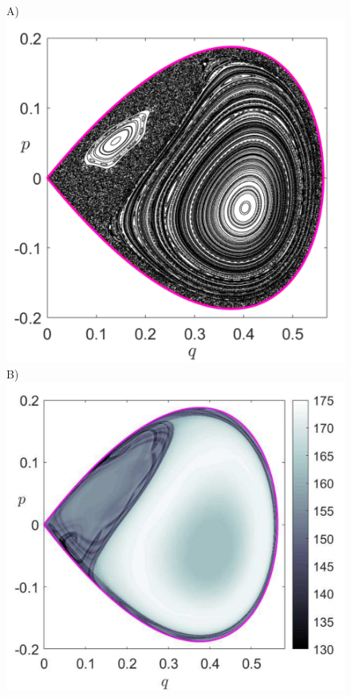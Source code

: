\documentclass{ws-ijbc}
\begin{document}
\begin{figure}[!ht]
	\begin{center}		
		A)\includegraphics[scale=0.45]{fig10a}	
		B)\includegraphics[scale=0.45]{fig10b}

\end{center}
\end{figure}
\end{document}
